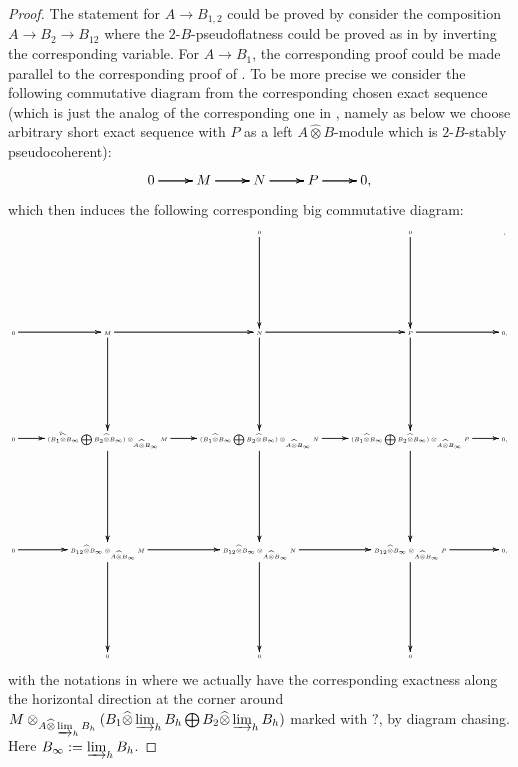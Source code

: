 \documentclass[12pt]{amsart}
\theoremstyle{definition}
\numberwithin{equation}{section}
\begin{document}
\begin{proof}
The statement for $A\rightarrow B_{1,2}$ could be proved by consider the composition $A\rightarrow B_2\rightarrow B_{12}$ where the $2$-$B$-pseudoflatness could be proved as in \cite[Lemma 2.4.13]{KL2} by inverting the corresponding variable. For $A\rightarrow B_{1}$,
the corresponding proof could be made parallel to the corresponding proof of \cite[Lemma 2.4.13]{KL2}. To be more precise we consider the following commutative diagram from the corresponding chosen exact sequence (which is just the analog of the corresponding one in \cite[Remark 2.4.5]{KL2}, namely as below we choose arbitrary short exact sequence with $P$ as a left $A\widehat{\otimes}B$-module which is $2$-$B$-stably pseudocoherent):
\[
\xymatrix@C+0pc@R+0pc{
0   \ar[r]\ar[r]\ar[r] &M \ar[r]\ar[r]\ar[r] &N \ar[r]\ar[r]\ar[r] & P \ar[r]\ar[r]\ar[r] &0,
}
\]
which then induces the following corresponding big commutative diagram:
\[\tiny
\xymatrix@C+0pc@R+5pc{
& &0 \ar[d]\ar[d]\ar[d] &0 \ar[d]\ar[d]\ar[d] &,\\
0   \ar[r]\ar[r]\ar[r]  &M \ar[r]\ar[r]\ar[r] \ar[d]\ar[d]\ar[d] &N \ar[r]\ar[r]\ar[r] \ar[d]\ar[d]\ar[d] & P \ar[r]\ar[r]\ar[r] \ar[d]\ar[d]\ar[d] &0,\\
0   \ar[r]^?\ar[r]\ar[r] &({B_1\widehat{\otimes}B_\infty}\bigoplus {B_2\widehat{\otimes}B_\infty}) \otimes_{A\widehat{\otimes}B_\infty}M  \ar[r]\ar[r]\ar[r] \ar[d]\ar[d]\ar[d] &({B_1\widehat{\otimes}B_\infty}\bigoplus {B_2\widehat{\otimes}B_\infty})\otimes_{A\widehat{\otimes}B_\infty}N  \ar[r]\ar[r]\ar[r] \ar[d]\ar[d]\ar[d] &({B_1\widehat{\otimes}B_\infty}\bigoplus {B_2\widehat{\otimes}B_\infty})\otimes_{A\widehat{\otimes}B_\infty}P\ar[r]\ar[r]\ar[r] \ar[d]\ar[d]\ar[d] &0,\\
0  \ar[r]\ar[r]\ar[r] &{B_{12}\widehat{\otimes}B_\infty}\otimes_{A\widehat{\otimes}B_\infty}M \ar[r]\ar[r]\ar[r] \ar[d]\ar[d]\ar[d] &{B_{12}\widehat{\otimes}B_\infty}\otimes_{A\widehat{\otimes}B_\infty}N \ar[r]\ar[r]\ar[r] \ar[d]\ar[d]\ar[d] &{B_{12}\widehat{\otimes}B_\infty} \otimes_{A\widehat{\otimes}B_\infty} P \ar[r]\ar[r]\ar[r] \ar[d]\ar[d]\ar[d] &0,\\
&0&0&0
}
\]
with the notations in \cite[Lemma 2.4.10]{KL2} where we actually have the corresponding exactness along the horizontal direction at the corner around $M\otimes_{A\widehat{\otimes}\varinjlim_h B_h} ({B_1\widehat{\otimes}\varinjlim_h B_h}\bigoplus {B_2\widehat{\otimes}\varinjlim_h B_h})$ marked with $?$, by diagram chasing. Here $B_\infty:=\varinjlim_h B_h$.
\end{proof}
\end{document}
